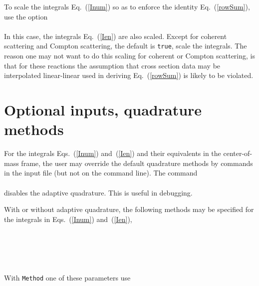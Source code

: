 To scale the integrals Eq.~(\ref{Inum}) so as to enforce the identity
Eq.~(\ref{rowSum}), use the option\\
  \\
In this case, the integrals Eq.~(\ref{Ien}) are also scaled.  Except for
coherent scattering and Compton scattering, the default
is \texttt{true}, scale the integrals.  The reason one may not want to do
this scaling for coherent or Compton scattering, is that for these reactions
the assumption that cross section data may be interpolated linear-linear
used in deriving Eq.~(\ref{rowSum}) is likely to be violated.

\section{Optional inputs, quadrature methods}\label{Sec:QuadratureMethods}
For the integrals Eqs.~(\ref{Inum}) and~(\ref{Ien}) and their equivalents
in the center-of-mass frame, the user may override the default quadrature methods
by commands in the input file (but not on the command line).  The command\\
  \\
disables the adaptive quadrature.  This is useful in debugging.

With or without adaptive quadrature, the following methods may
be specified for the integrals in Eqs.~(\ref{Inum}) and~(\ref{Ien}),\\
  \\
  \\
  \\
  \\
  \\
With \texttt{Method} one of these parameters use\\
  \\
  \\
  \\

